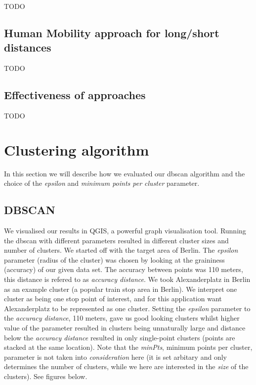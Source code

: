 TODO

\subsection{Human Mobility approach for long/short distances}

TODO

\subsection{Effectiveness of approaches}

TODO

\section{Clustering algorithm}

In this section we will describe how we evaluated our dbscan algorithm and the choice of the \textit{epsilon} and \textit{minimum points per cluster} parameter.

\subsection{DBSCAN}

We visualised our results in QGIS, a powerful graph visualisation tool. Running the dbscan with different parameters resulted in different cluster sizes and number of clusters. We started off with the target area of Berlin. The \textit{epsilon} parameter (radius of the cluster) was chosen by looking at the graininess (accuracy) of our given data set. The accuracy between points was 110 meters, this distance is refered to as \textit{accuracy distance}.
We took Alexanderplatz in Berlin as an example cluster (a popular train stop area in Berlin). We interpret one cluster as being one stop point of interest, and for this application want Alexanderplatz to be represented as one cluster. Setting the \textit{epsilon} parameter to the \textit{accuracy distance},  110 meters, gave us good looking clusters whilst higher value of the parameter resulted in clusters being unnaturally large and distance below the \textit{accuracy distance} resulted in only single-point clusters (points are stacked at the same location). Note that the \textit{minPts}, minimum points per cluster, parameter is not taken into \textit{consideration} here (it is set arbitary and only determines the number of clusters, while we here are interested in the \textit{size} of the clusters). See figures below.

